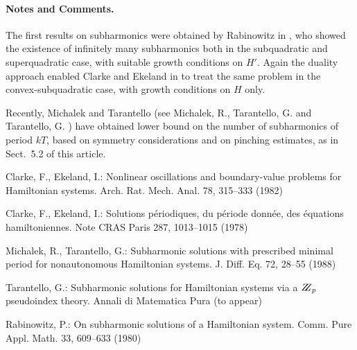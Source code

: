 \documentclass{llncs}
\begin{document}
\paragraph{Notes and Comments.}
The first results on subharmonics were
obtained by Rabinowitz in \cite{2rab}, who showed the existence of
infinitely many subharmonics both in the subquadratic and superquadratic
case, with suitable growth conditions on $H'$. Again the duality
approach enabled Clarke and Ekeland in \cite{2clar:eke:2} to treat the
same problem in the convex-subquadratic case, with growth conditions on
$H$ only.

Recently, Michalek and Tarantello (see Michalek, R., Tarantello, G.
\cite{2mich:tar} and Tarantello, G. \cite{2tar}) have obtained lower
bound on the number of subharmonics of period $kT$, based on symmetry
considerations and on pinching estimates, as in Sect.~5.2 of this
article.

%
%
\begin{thebibliography}{}
%
Clarke, F., Ekeland, I.:
Nonlinear oscillations and
boundary-value problems for Hamiltonian systems.
Arch. Rat. Mech. Anal. 78, 315--333 (1982)

Clarke, F., Ekeland, I.:
Solutions p\'{e}riodiques, du
p\'{e}riode donn\'{e}e, des \'{e}quations hamiltoniennes.
Note CRAS Paris 287, 1013--1015 (1978)

Michalek, R., Tarantello, G.:
Subharmonic solutions with prescribed minimal
period for nonautonomous Hamiltonian systems.
J. Diff. Eq. 72, 28--55 (1988)

Tarantello, G.:
Subharmonic solutions for Hamiltonian
systems via a $\bbbz_{p}$ pseudoindex theory.
Annali di Matematica Pura (to appear)

Rabinowitz, P.:
On subharmonic solutions of a Hamiltonian system.
Comm. Pure Appl. Math. 33, 609--633 (1980)

\end{thebibliography}
\clearpage
{} %
\renewcommand{\indexname}{Author Index}
\printindex
\clearpage
\end{document}
